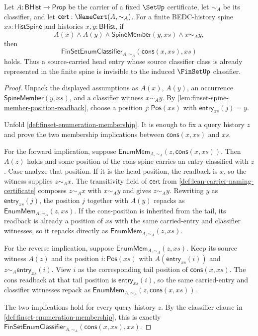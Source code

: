 \begin{theorem}
\label{thm:finset-duplicate-insertion-invariant}
Let $A:\mathsf{BHist}\to\mathsf{Prop}$ be the carrier of a fixed $\SetUp$ certificate, let $\sim_A$ be its classifier, and let $\mathsf{cert}:\NameCert(A,\sim_A)$. For a finite BEDC-history spine $xs:\mathsf{HistSpine}$ and histories $x,y:\mathsf{BHist}$, if
$$
A(x)\land A(y)\land \mathsf{SpineMember}(y,xs)\land x\sim_A y,
$$
then
$$
\mathsf{FinSetEnumClassifier}_{A,\sim_A}(\mathsf{cons}(x,xs),xs)
$$
holds. Thus a source-carried head entry whose source classifier class is already represented in the finite spine is invisible to the induced $\FinSetUp$ classifier.
\end{theorem}
\begin{proof}
Unpack the displayed assumptions as $A(x)$, $A(y)$, an occurrence $\mathsf{SpineMember}(y,xs)$, and a classifier witness $x\sim_A y$. By \autoref{lem:finset-spine-member-position-readback}, choose a position $j:\mathsf{Pos}(xs)$ with $\mathsf{entry}_{xs}(j)=y$.

Unfold \autoref{def:finset-enumeration-membership}. It is enough to fix a query history $z$ and prove the two membership implications between $\mathsf{cons}(x,xs)$ and $xs$.

For the forward implication, suppose $\mathsf{EnumMem}_{A,\sim_A}(z,\mathsf{cons}(x,xs))$. Then $A(z)$ holds and some position of the cons spine carries an entry classified with $z$. Case-analyze that position. If it is the head position, the readback is $x$, so the witness supplies $z\sim_A x$. The transitivity field of $\mathsf{cert}$ from \autoref{def:lean-carrier-naming-certificate} composes $z\sim_A x$ with $x\sim_A y$ and gives $z\sim_A y$. Rewriting $y$ as $\mathsf{entry}_{xs}(j)$, the position $j$ together with $A(y)$ repacks as $\mathsf{EnumMem}_{A,\sim_A}(z,xs)$. If the cons-position is inherited from the tail, its readback is already a position of $xs$ with the same carried-entry and classifier witnesses, so it repacks directly as $\mathsf{EnumMem}_{A,\sim_A}(z,xs)$.

For the reverse implication, suppose $\mathsf{EnumMem}_{A,\sim_A}(z,xs)$. Keep its source witness $A(z)$ and its position $i:\mathsf{Pos}(xs)$ with $A(\mathsf{entry}_{xs}(i))$ and $z\sim_A\mathsf{entry}_{xs}(i)$. View $i$ as the corresponding tail position of $\mathsf{cons}(x,xs)$. The cons readback at that tail position is $\mathsf{entry}_{xs}(i)$, so the same carried-entry and classifier witnesses repack as $\mathsf{EnumMem}_{A,\sim_A}(z,\mathsf{cons}(x,xs))$.

The two implications hold for every query history $z$. By the classifier clause in \autoref{def:finset-enumeration-membership}, this is exactly $\mathsf{FinSetEnumClassifier}_{A,\sim_A}(\mathsf{cons}(x,xs),xs)$.
\end{proof}

